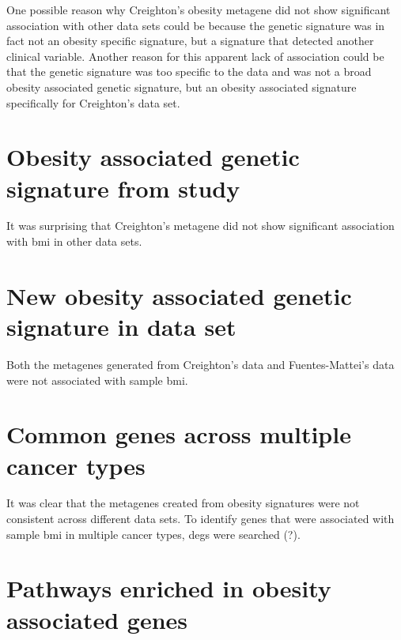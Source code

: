 One possible reason why Creighton's obesity metagene did not show significant association with other data sets could be because the genetic signature was in fact not an obesity specific signature, but a signature that detected another clinical variable.
Another reason for this apparent lack of association could be that the genetic signature was too specific to the data and was not a broad obesity associated genetic signature, but an obesity associated signature specifically for Creighton's data set.

\section{Obesity associated genetic signature from \citet{Fuentes-Mattei2014} study}
\label{sec:fm_obesity_metagene}

It was surprising that Creighton's metagene did not show significant association with \gls{bmi} in other data sets.










\section{New obesity associated genetic signature in \citet{Creighton2012} data set}
\label{sec:creighton_obesity_metagene_new}

Both the metagenes generated from Creighton's data and Fuentes-Mattei's data were not associated with sample \gls{bmi}.








\section{Common genes across multiple cancer types}
\label{sec:common_genes_across_multiple_cancer_types}

It was clear that the metagenes created from obesity signatures were not consistent across different data sets.
To identify genes that were associated with sample \gls{bmi} in multiple cancer types, \glspl{deg} were searched (?).







\section{Pathways enriched in obesity associated genes}
\label{sec:pathways_enriched_in_obesity_associated_genes}












